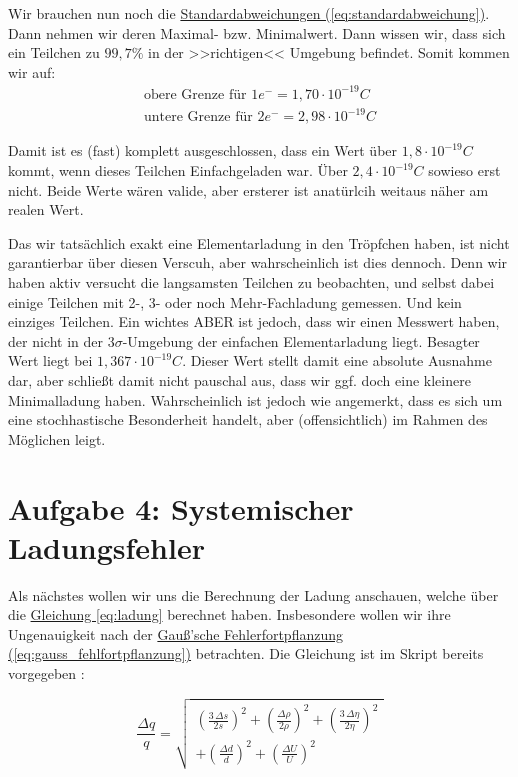 Wir brauchen nun noch die \hyperref[eq:standardabweichung]{Standardabweichungen (\ref*{eq:standardabweichung})}. Dann nehmen wir deren Maximal- bzw. Minimalwert. Dann wissen wir, dass sich ein Teilchen zu $99,7\%$ in der >>richtigen<< Umgebung befindet.
Somit kommen wir auf:
\begin{align}
    \text{obere Grenze für } 1e^- = 1,70 \cdot 10^{-19}C \\
    \text{untere Grenze für } 2e^- = 2,98 \cdot 10^{-19}C 
\end{align}

Damit ist es (fast) komplett ausgeschlossen, dass ein Wert über $1,8 \cdot 10^{-19}C$ kommt, wenn dieses Teilchen Einfachgeladen war. Über $2,4 \cdot 10^{-19}C$ sowieso erst nicht. Beide Werte wären valide, aber ersterer ist anatürlcih weitaus näher am realen Wert.

Das wir tatsächlich exakt eine Elementarladung in den Tröpfchen haben, ist nicht garantierbar über diesen Verscuh, aber wahrscheinlich ist dies dennoch. 
Denn wir haben aktiv versucht die langsamsten Teilchen zu beobachten, und selbst dabei einige Teilchen mit 2-, 3- oder noch Mehr-Fachladung gemessen. Und kein einziges Teilchen.
Ein wichtes ABER ist jedoch, dass wir einen Messwert haben, der nicht in der $3\sigma$-Umgebung der einfachen Elementarladung liegt. Besagter Wert liegt bei $1,367 \cdot 10^{-19}C$. 
Dieser Wert stellt damit eine absolute Ausnahme dar, aber schließt damit nicht pauschal aus, dass wir ggf. doch eine kleinere Minimalladung haben. Wahrscheinlich ist jedoch wie angemerkt, dass es sich um eine stochhastische Besonderheit handelt, aber (offensichtlich) im Rahmen des Möglichen leigt. 

\section{Aufgabe 4: Systemischer Ladungsfehler}
Als nächstes wollen wir uns die Berechnung der Ladung anschauen, welche über die \hyperref[eq:ladung]{Gleichung \ref*{eq:ladung}} berechnet haben. Insbesondere wollen wir ihre Ungenauigkeit nach der \hyperref[eq:gauss_fehlfortpflanzung]{Gauß'sche Fehlerfortpflanzung (\ref*{eq:gauss_fehlfortpflanzung})} betrachten. 
Die Gleichung ist im Skript bereits vorgegeben \cite{skript25}:

\begin{equation}
    \frac{\Delta q}{q} =
    \sqrt{
        \begin{array}{l}
            \left( \tfrac{3 \,\Delta s}{2s} \right)^{2}
            + \left( \tfrac{\Delta \rho}{2\rho} \right)^{2}
            + \left( \tfrac{3 \,\Delta \eta}{2\eta} \right)^{2} \\[6pt]
            + \left( \tfrac{\Delta d}{d} \right)^{2}
            + \left( \tfrac{\Delta U}{U} \right)^{2}
        \end{array}
    }
    \label{eq:fehler_q}
\end{equation}

